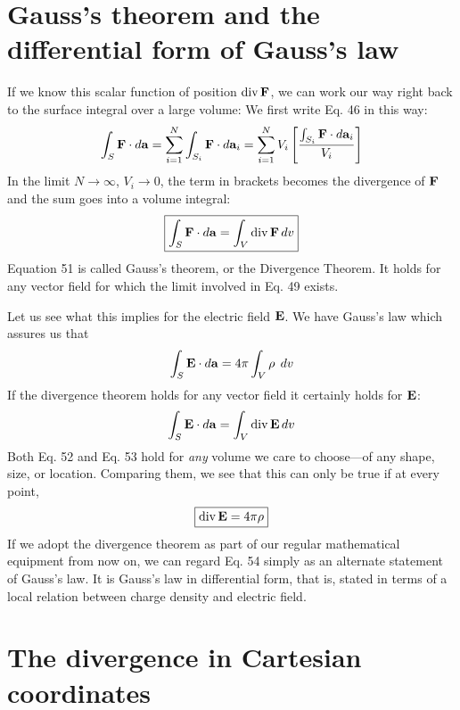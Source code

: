 \section{Gauss's theorem and the differential form of Gauss's law}

If we know this scalar function of position $\operatorname{div}\mathbf{F}$, we can work our
way right back to the surface integral over a large volume: We first
write Eq. 46 in this way:
\begin{equation}
  \int_S\mathbf{F}\cdot\mathop{d\!}\mathbf{a} = \sum_{i=1}^N\int_{S_i} \mathbf{F}\cdot\mathop{d\!}\mathbf{a}_i
           = \sum_{i=1}^N V_i \left[\frac{\int_{S_i} \mathbf{F}\cdot\mathop{d\!}\mathbf{a}_i}{V_i}\right]
\end{equation}
In the limit $N \rightarrow \infty$, $V_i\rightarrow0$, the term in brackets becomes the divergence
of $\mathbf{F}$ and the sum goes into a volume integral:
\begin{equation}
\boxed{
  \int_S\mathbf{F}\cdot\mathop{d\!}\mathbf{a} = \int_V \operatorname{div}\mathbf{F}\mathop{d\!} v
}
\end{equation}
Equation 51 is called Gauss's theorem, or the Divergence Theorem.
It holds for any vector field for which the limit involved in Eq. 49
exists.

Let us see what this implies for the electric field $\mathbf{E}$. We have
Gauss's law which assures us that
\begin{equation}
  \int_S\mathbf{E}\cdot\mathop{d\!}\mathbf{a} = 4\pi\int_V\rho\;\mathop{d\!} v
\end{equation}
If the divergence theorem holds for any vector field it certainly holds
for $\mathbf{E}$:
\begin{equation}
  \int_S\mathbf{E}\cdot\mathop{d\!}\mathbf{a} = \int_V \operatorname{div}\mathbf{E}\mathop{d\!} v
\end{equation}
Both Eq. 52 and Eq. 53 hold for \emph{any} volume we care to choose---of
any shape, size, or location. Comparing them, we see that this can
only be true if at every point,
\begin{equation}
\boxed{
  \operatorname{div}\mathbf{E} = 4\pi\rho
}
\end{equation}
If we adopt the divergence theorem as part of our regular mathematical
equipment from now on, we can regard Eq. 54 simply as an alternate
statement of Gauss's law. It is Gauss's law in differential form,
that is, stated in terms of a local relation between charge density and
electric field.

\section{The divergence in Cartesian coordinates}

